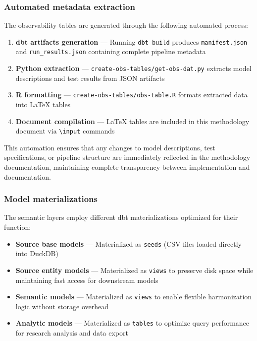 \documentclass{article}
\begin{document}
\subsubsection{Automated metadata extraction}

The observability tables are generated through the following automated process:

\begin{enumerate}
    \item \textbf{dbt artifacts generation} — Running \texttt{dbt build} produces \texttt{manifest.json} and \texttt{run\_results.json} containing complete pipeline metadata
    \item \textbf{Python extraction} — \texttt{create-obs-tables/get-obs-dat.py} extracts model descriptions and test results from JSON artifacts
    \item \textbf{R formatting} — \texttt{create-obs-tables/obs-table.R} formats extracted data into LaTeX tables
    \item \textbf{Document compilation} — LaTeX tables are included in this methodology document via \texttt{\textbackslash input} commands
\end{enumerate}

This automation ensures that any changes to model descriptions, test specifications, or pipeline structure are immediately reflected in the methodology documentation, maintaining complete transparency between implementation and documentation.

\subsubsection{Model materializations}

The semantic layers employ different dbt materializations optimized for their function:

\begin{itemize}
    \item \textbf{Source base models} — Materialized as \texttt{seeds} (CSV files loaded directly into DuckDB)
    \item \textbf{Source entity models} — Materialized as \texttt{views} to preserve disk space while maintaining fast access for downstream models
    \item \textbf{Semantic models} — Materialized as \texttt{views} to enable flexible harmonization logic without storage overhead
    \item \textbf{Analytic models} — Materialized as \texttt{tables} to optimize query performance for research analysis and data export
\end{itemize}
\end{document}
